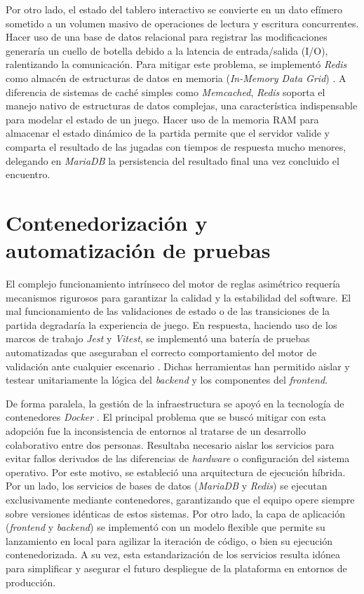 Por otro lado, el estado del tablero interactivo se convierte en un dato efímero sometido a un volumen masivo de operaciones de lectura y escritura concurrentes. Hacer uso de una base de datos relacional para registrar las modificaciones generaría un cuello de botella debido a la latencia de entrada/salida (I/O), ralentizando la comunicación. Para mitigar este problema, se implementó \textit{Redis} como almacén de estructuras de datos en memoria (\textit{In-Memory Data Grid}) \cite{carlson_redis}. A diferencia de sistemas de caché simples como \textit{Memcached}, \textit{Redis} soporta el manejo nativo de estructuras de datos complejas, una característica indispensable para modelar el estado de un juego. Hacer uso de la memoria RAM para almacenar el estado dinámico de la partida permite que el servidor valide y comparta el resultado de las jugadas con tiempos de respuesta mucho menores, delegando en \textit{MariaDB} la persistencia del resultado final una vez concluido el encuentro.

\section{Contenedorización y automatización de pruebas}

El complejo funcionamiento intrínseco del motor de reglas asimétrico requería mecanismos rigurosos para garantizar la calidad y la estabilidad del software. El mal funcionamiento de las validaciones de estado o de las transiciones de la partida degradaría la experiencia de juego. En respuesta, haciendo uso de los marcos de trabajo \textit{Jest} y \textit{Vitest}, se implementó una batería de pruebas automatizadas que aseguraban el correcto comportamiento del motor de validación ante cualquier escenario \cite{myers_testing}. Dichas herramientas han permitido aislar y testear unitariamente la lógica del \textit{backend} y los componentes del \textit{frontend}.

De forma paralela, la gestión de la infraestructura se apoyó en la tecnología de contenedores \textit{Docker} \cite{turnbull_docker}. El principal problema que se buscó mitigar con esta adopción fue la inconsistencia de entornos al tratarse de un desarrollo colaborativo entre dos personas. Resultaba necesario aislar los servicios para evitar fallos derivados de las diferencias de \textit{hardware} o configuración del sistema operativo. Por este motivo, se estableció una arquitectura de ejecución híbrida. Por un lado, los servicios de bases de datos (\textit{MariaDB} y \textit{Redis}) se ejecutan exclusivamente mediante contenedores, garantizando que el equipo opere siempre sobre versiones idénticas de estos sistemas. Por otro lado, la capa de aplicación (\textit{frontend} y \textit{backend}) se implementó con un modelo flexible que permite su lanzamiento en local para agilizar la iteración de código, o bien su ejecución contenedorizada. A su vez, esta estandarización de los servicios resulta idónea para simplificar y asegurar el futuro despliegue de la plataforma en entornos de producción.